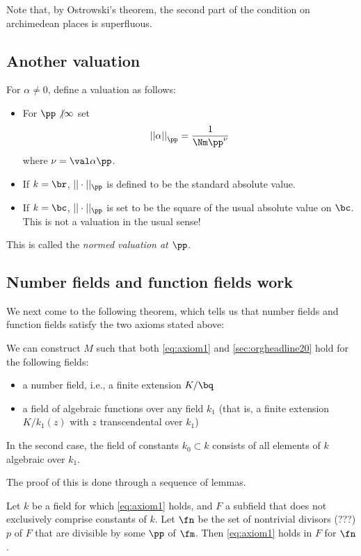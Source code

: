 Note that, by Ostrowski's theorem, the second part of the condition on
archimedean places is superfluous.

\subsection{Another valuation}
\label{sec:orgheadline21}
For $\alpha\neq 0$, define a valuation as follows:
\begin{itemize}
\item For $\pp \not | \infty$ set
  \[ { ||\alpha|| }_\pp = \frac1{ \Nm\pp^\nu } \]
  where $\nu = \val \alpha \pp$.
\item If $k=\br$, $||\cdot||_\pp$ is defined to be the standard absolute value.
\item If $k=\bc$, $||\cdot||_\pp$ is set to be the square of the usual absolute
  value on $\bc$. This is not a valuation in the usual sense!
\end{itemize}
This is called the \textit{normed valuation at $\pp$}.

\subsection{Number fields and function fields work}
We next come to the following theorem, which tells us that number fields and
function fields satisfy the two axioms stated above:

\begin{thm}
  We can construct $M$ such that both \ref{eq:axiom1} and
  \ref{sec:orgheadline20} hold for the following fields:
  \begin{itemize}
  \item a number field, i.e., a finite extension $K/\bq$
  \item a field of algebraic functions over any field $k_1$ (that is, a finite
    extension $K/k_1(z)$ with $z$ transcendental over $k_1$)
  \end{itemize}
  In the second case, the field of constants $k_0 \subset k$ consists of all
  elements of $k$ algebraic over $k_1$.
\end{thm}

The proof of this is done through a sequence of lemmas.

\begin{lemma}
  Let $k$ be a field for which \ref{eq:axiom1} holds, and $F$ a subfield that
  does not exclusively comprise constants of $k$. Let $\fn$ be the set of
  nontrivial divisors (???) $p$ of $F$ that are divisible by some $\pp$ of $\fm$.
  Then \ref{eq:axiom1} holds in $F$ for $\fn$.
\end{lemma}

